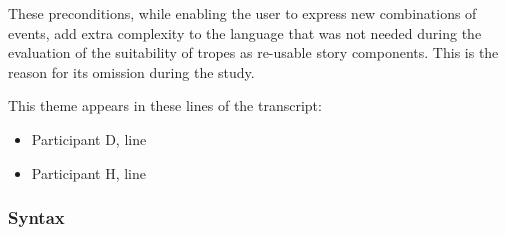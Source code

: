 \documentclass[11pt]{report}
\begin{document}
\begin{itemize}
These preconditions, while enabling the user to express new combinations of
events, add extra complexity to the language that was not needed during the
evaluation of the suitability of tropes as re-usable story components. This is
the reason for its omission during the study.

This theme appears in these lines of the transcript:

\begin{itemize}
\item Participant D, line~
\item Participant H, line~
\end{itemize}
\end{itemize}

\subsubsection{Syntax}
\end{document}
